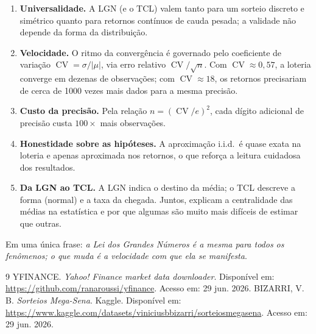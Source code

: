 \documentclass[12pt,a4paper]{article}
\newcommand{\CV}{\operatorname{CV}}
\begin{document}
\begin{enumerate}
  \item \textbf{Universalidade.} A LGN (e o TCL) valem tanto para um sorteio discreto e
        simétrico quanto para retornos contínuos de cauda pesada; a validade não depende
        da forma da distribuição.
  \item \textbf{Velocidade.} O ritmo da convergência é governado pelo coeficiente de
        variação $\CV=\sigma/|\mu|$, via erro relativo $\CV/\sqrt{n}$. Com
        $\CV\approx0{,}57$, a loteria converge em dezenas de observações; com
        $\CV\approx18$, os retornos precisariam de cerca de \num{1000} vezes mais dados
        para a mesma precisão.
  \item \textbf{Custo da precisão.} Pela relação $n=(\CV/e)^2$, cada dígito adicional de
        precisão custa $100\times$ mais observações.
  \item \textbf{Honestidade sobre as hipóteses.} A aproximação i.i.d.\ é quase exata na
        loteria e apenas aproximada nos retornos, o que reforça a leitura cuidadosa dos
        resultados.
  \item \textbf{Da LGN ao TCL.} A LGN indica o destino da média; o TCL descreve a forma
        (normal) e a taxa da chegada. Juntos, explicam a centralidade das médias na
        estatística e por que algumas são muito mais difíceis de estimar que outras.
\end{enumerate}

Em uma única frase: \emph{a Lei dos Grandes Números é a mesma para todos os fenômenos;
o que muda é a velocidade com que ela se manifesta}.

\clearpage
\begin{thebibliography}{9}
 YFINANCE. \emph{Yahoo! Finance market data downloader}.
  Disponível em: \url{https://github.com/ranaroussi/yfinance}. Acesso em: 29 jun. 2026.
 BIZARRI, V. B. \emph{Sorteios Mega-Sena}. Kaggle. Disponível em:
  \url{https://www.kaggle.com/datasets/viniciusbbizarri/sorteiosmegasena}.
  Acesso em: 29 jun. 2026.
\end{thebibliography}
\end{document}

